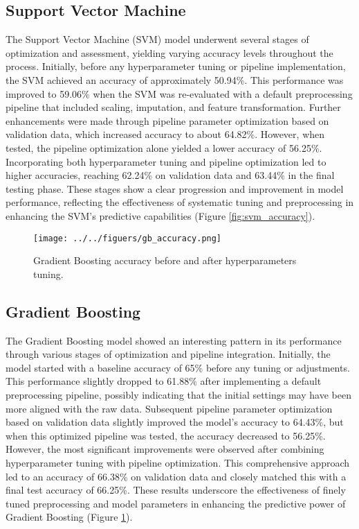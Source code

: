 \documentclass[
	letterpaper, %
	12pt, %
	unnumberedsections, %
	twoside, %
]{LTJournalArticle}
\begin{document}
\subsection{Support Vector Machine}  
The Support Vector Machine (SVM) model underwent several stages of optimization and assessment, yielding varying accuracy levels throughout the process. Initially, before any hyperparameter tuning or pipeline implementation, the SVM achieved an accuracy of approximately 50.94\%. This performance was improved to 59.06\% when the SVM was re-evaluated with a default preprocessing pipeline that included scaling, imputation, and feature transformation. Further enhancements were made through pipeline parameter optimization based on validation data, which increased accuracy to about 64.82\%. However, when tested, the pipeline optimization alone yielded a lower accuracy of 56.25\%. Incorporating both hyperparameter tuning and pipeline optimization led to higher accuracies, reaching 62.24\% on validation data and 63.44\% in the final testing phase. These stages show a clear progression and improvement in model performance, reflecting the effectiveness of systematic tuning and preprocessing in enhancing the SVM's predictive capabilities (Figure \ref{fig:svm_accuracy}).

\begin{figure}
	\texttt{[image: ../../figuers/gb\_accuracy.png]}
	\caption{Gradient Boosting accuracy before and after hyperparameters tuning.}
	\label{fig:gb_accuracy}
\end{figure}

\subsection{Gradient Boosting}
The Gradient Boosting model showed an interesting pattern in its performance through various stages of optimization and pipeline integration. Initially, the model started with a baseline accuracy of 65\% before any tuning or adjustments. This performance slightly dropped to 61.88\% after implementing a default preprocessing pipeline, possibly indicating that the initial settings may have been more aligned with the raw data. Subsequent pipeline parameter optimization based on validation data slightly improved the model's accuracy to 64.43\%, but when this optimized pipeline was tested, the accuracy decreased to 56.25\%.
However, the most significant improvements were observed after combining hyperparameter tuning with pipeline optimization. This comprehensive approach led to an accuracy of 66.38\% on validation data and closely matched this with a final test accuracy of 66.25\%. These results underscore the effectiveness of finely tuned preprocessing and model parameters in enhancing the predictive power of Gradient Boosting (Figure \ref{fig:gb_accuracy}).
\end{document}
